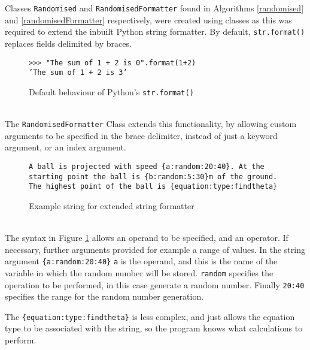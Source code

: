 Classes \texttt{Randomised} and \texttt{RandomisedFormatter} found in Algorithms \ref{randomised} and \ref{randomisedFormatter} respectively, were created using classes as this was required to extend the inbuilt Python string formatter. By default, \texttt{str.format()} replaces fields delimited by braces\autocite{pystr}.
\begin{figure}[h]
	\centering
	\texttt{>>> "The sum of 1 + 2 is {0}".format(1+2)}\\
	\texttt{'The sum of 1 + 2 is 3'}
	\caption{Default behaviour of Python's \texttt{str.format()}\autocite{pystr}}
\end{figure}
\\
The \texttt{RandomisedFormatter} Class extends this functionality, by allowing custom arguments to be specified in the brace delimiter, instead of just a keyword argument, or an index argument. 
\begin{figure}[h]
	\label{exformat}
	\centering
	\texttt{A ball is projected with speed \{a:random:20:40\}. At the starting point the ball is \{b:random:5:30\}m of the ground. The highest point of the ball is \{equation:type:findtheta\}}
	\caption{Example string for extended string formatter}
\end{figure}
\\
The syntax in Figure \ref{exformat} allows an operand to be specified, and an operator. If necessary, further arguments provided for example a range of values. In the string argument \texttt{\{a:random:20:40\}} \texttt{a} is the operand, and this is the name of the variable in which the random number will be stored. \texttt{random} specifies the operation to be performed, in this case generate a random number. Finally \texttt{20:40} specifies the range for the random number generation.

The \texttt{\{equation:type:findtheta\}} is less complex, and just allows the equation type to be associated with the string, so the program knows what calculations to perform.
